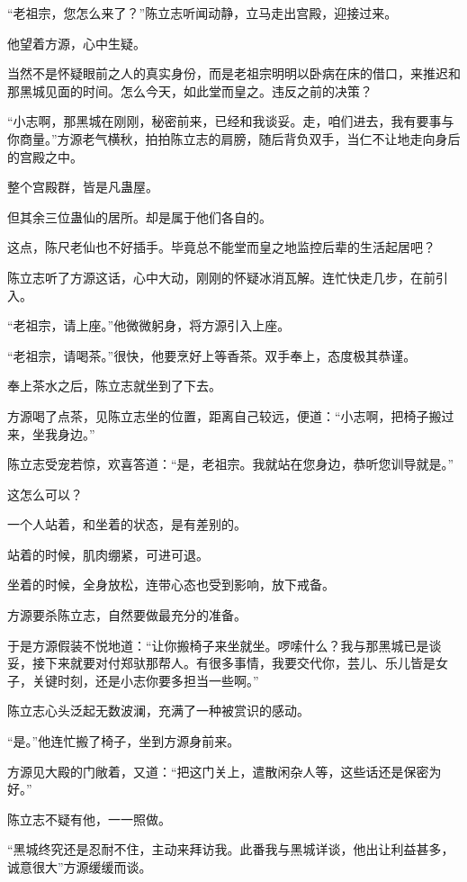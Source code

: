 \begin{this_body}
“老祖宗，您怎么来了？”陈立志听闻动静，立马走出宫殿，迎接过来。

他望着方源，心中生疑。

当然不是怀疑眼前之人的真实身份，而是老祖宗明明以卧病在床的借口，来推迟和那黑城见面的时间。怎么今天，如此堂而皇之。违反之前的决策？

“小志啊，那黑城在刚刚，秘密前来，已经和我谈妥。走，咱们进去，我有要事与你商量。”方源老气横秋，拍拍陈立志的肩膀，随后背负双手，当仁不让地走向身后的宫殿之中。

整个宫殿群，皆是凡蛊屋。

但其余三位蛊仙的居所。却是属于他们各自的。

这点，陈尺老仙也不好插手。毕竟总不能堂而皇之地监控后辈的生活起居吧？

陈立志听了方源这话，心中大动，刚刚的怀疑冰消瓦解。连忙快走几步，在前引入。

“老祖宗，请上座。”他微微躬身，将方源引入上座。

“老祖宗，请喝茶。”很快，他要烹好上等香茶。双手奉上，态度极其恭谨。

奉上茶水之后，陈立志就坐到了下去。

方源喝了点茶，见陈立志坐的位置，距离自己较远，便道：“小志啊，把椅子搬过来，坐我身边。”

陈立志受宠若惊，欢喜答道：“是，老祖宗。我就站在您身边，恭听您训导就是。”

这怎么可以？

一个人站着，和坐着的状态，是有差别的。

站着的时候，肌肉绷紧，可进可退。

坐着的时候，全身放松，连带心态也受到影响，放下戒备。

方源要杀陈立志，自然要做最充分的准备。

于是方源假装不悦地道：“让你搬椅子来坐就坐。啰嗦什么？我与那黑城已是谈妥，接下来就要对付郑驮那帮人。有很多事情，我要交代你，芸儿、乐儿皆是女子，关键时刻，还是小志你要多担当一些啊。”

陈立志心头泛起无数波澜，充满了一种被赏识的感动。

“是。”他连忙搬了椅子，坐到方源身前来。

方源见大殿的门敞着，又道：“把这门关上，遣散闲杂人等，这些话还是保密为好。”

陈立志不疑有他，一一照做。

“黑城终究还是忍耐不住，主动来拜访我。此番我与黑城详谈，他出让利益甚多，诚意很大”方源缓缓而谈。


\end{this_body}
